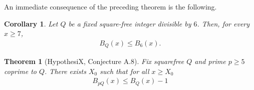 \documentclass[11pt,reqno]{amsart}
\theoremstyle{plain}\newtheorem{theorem}{Theorem}[section]
\newtheorem{corollary}{Corollary}[section]
\numberwithin{equation}{section}
\begin{document}
\noindent
An immediate consequence of the preceding theorem is the following.
\begin{corollary}
Let $Q$ be a fixed square-free integer divisible by $6$. Then, for every $x \geq 7$,
\begin{align*}
B_Q(x) \leq B_6(x).
\end{align*}
\end{corollary}

\begin{theorem}[HypothesiX, Conjecture A.8]\label{primedrop}
Fix squarefree $Q$ and prime $p \geq 5$ coprime to $Q$. There exists $X_0$ such that for all $x \geq X_0$
\begin{align*}
B_{pQ}(x)\leq B_Q(x)-1    
\end{align*}          
\end{theorem} 
\end{document}
